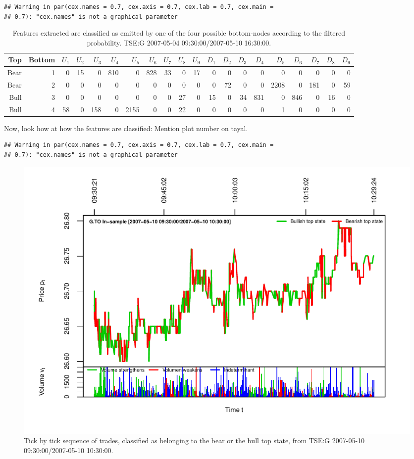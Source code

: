 \documentclass[]{article}
\begin{document}
\begin{verbatim}
## Warning in par(cex.names = 0.7, cex.axis = 0.7, cex.lab = 0.7, cex.main =
## 0.7): "cex.names" is not a graphical parameter
\end{verbatim}

\begin{table}[ht]
\centering
\begingroup\scriptsize
\begin{tabularx}{\textwidth}{rRRRRRRRRRRRRRRRRRRR}
  \toprule
Top & Bottom & $U_{1}$ & $U_{2}$ & $U_{3}$ & $U_{4}$ & $U_{5}$ & $U_{6}$ & $U_{7}$ & $U_{8}$ & $U_{9}$ & $D_{1}$ & $D_{2}$ & $D_{3}$ & $D_{4}$ & $D_{5}$ & $D_{6}$ & $D_{7}$ & $D_{8}$ & $D_{9}$ \\ 
  \midrule
Bear & 1 & 0 & 15 & 0 & 810 & 0 & 828 & 33 & 0 & 17 & 0 & 0 & 0 & 0 & 0 & 0 & 0 & 0 & 0 \\ 
  Bear & 2 & 0 & 0 & 0 & 0 & 0 & 0 & 0 & 0 & 0 & 0 & 72 & 0 & 0 & 2208 & 0 & 181 & 0 & 59 \\ 
  Bull & 3 & 0 & 0 & 0 & 0 & 0 & 0 & 0 & 27 & 0 & 15 & 0 & 34 & 831 & 0 & 846 & 0 & 16 & 0 \\ 
  Bull & 4 & 58 & 0 & 158 & 0 & 2155 & 0 & 0 & 22 & 0 & 0 & 0 & 0 & 0 & 1 & 0 & 0 & 0 & 0 \\ 
   \bottomrule
\end{tabularx}
\endgroup
\caption{Features extracted are classified as emitted by one
               of the four possible bottom-nodes according to the filtered
               probability. TSE:G 2007-05-04 09:30:00/2007-05-10 16:30:00.} 
\label{tab:tseg-filtered-ins}
\end{table}

Now, look how at how the features are classified: Mention plot number on
tayal.

\begin{verbatim}
## Warning in par(cex.names = 0.7, cex.axis = 0.7, cex.lab = 0.7, cex.main =
## 0.7): "cex.names" is not a graphical parameter
\end{verbatim}

\begin{figure}[H]
\includegraphics[width=\textwidth]{main_files/figure-latex/unnamed-chunk-18-1} \caption{Tick by tick sequence of trades, classified as belonging to the bear or the bull top state, from TSE:G 2007-05-10 09:30:00/2007-05-10 10:30:00. \label{fig:tseg-ins-seqv}}\label{fig:unnamed-chunk-18}
\end{figure}
\end{document}
